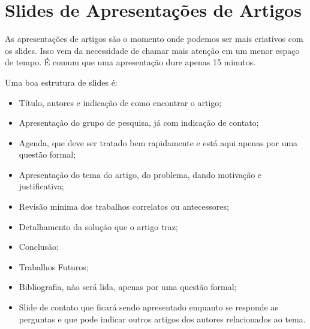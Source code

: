 \section{Slides de Apresentações de Artigos}

As apresentações de artigos são o momento onde podemos ser mais criativos com os slides. Isso vem da necessidade de chamar mais atenção em um menor espaço de tempo. É comum que uma apresentação dure apenas 15 minutos.


Uma boa estrutura de slides é:
\begin{itemize}
    \item Título, autores e indicação de como encontrar o artigo;
    \item Apresentação do grupo de pesquisa, já com indicação de contato;
    \item Agenda, que deve ser tratado bem rapidamente e está aqui apenas por uma questão formal;
    \item Apresentação do tema do artigo, do problema, dando motivação e justificativa;
    \item Revisão mínima dos trabalhos correlatos ou antecessores;
    \item Detalhamento da solução que o artigo traz;
    \item Conclusão;
    \item Trabalhos Futuros;
    \item Bibliografia, não será lida, apenas por uma questão formal;
    \item Slide de contato que ficará sendo apresentado enquanto se responde as perguntas e que pode indicar outros artigos dos autores relacionados ao tema.
\end{itemize}
